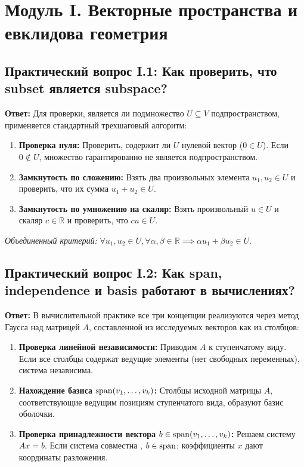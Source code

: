 \section{Модуль I. Векторные пространства и евклидова геометрия}

\subsection{Практический вопрос I.1: Как проверить, что subset является subspace?}
\textbf{Ответ:} Для проверки, является ли подмножество $U \subseteq V$ подпространством, применяется стандартный
трехшаговый алгоритм:
\begin{enumerate}
    \item \textbf{Проверка нуля:} Проверить, содержит ли $U$ нулевой вектор ($0 \in U$).
    Если $0 \notin U$, множество гарантированно не является подпространством.
    \item \textbf{Замкнутость по сложению:} Взять два произвольных элемента $u_1, u_2 \in U$ и проверить, что их
    сумма $u_1 + u_2 \in U$.
    \item \textbf{Замкнутость по умножению на скаляр:} Взять произвольный $u \in U$ и скаляр $c \in \mathbb{R}$
    и проверить, что $c u \in U$.
\end{enumerate}
\emph{Объединенный критерий:} $\forall u_1, u_2 \in U, \forall \alpha, \beta \in \mathbb{R} \implies \alpha u_1 + \beta
u_2 \in U$.

\subsection{Практический вопрос I.2: Как span, independence и basis работают в вычислениях?}
\textbf{Ответ:} В вычислительной практике все три концепции реализуются через метод Гаусса над матрицей $A$,
составленной из исследуемых векторов как из столбцов:
\begin{enumerate}
    \item \textbf{Проверка линейной независимости:} Приводим $A$ к ступенчатому виду.
    Если все столбцы содержат ведущие элементы (нет свободных переменных), система независима.
    \item \textbf{Нахождение базиса $\operatorname{span}(v_1, \dots, v_k)$:} Столбцы исходной матрицы $A$, соответствующие
    ведущим позициям ступенчатого вида, образуют базис оболочки.
    \item \textbf{Проверка принадлежности вектора $b \in \operatorname{span}(v_1, \dots, v_k)$:} Решаем систему $Ax = b$.
    Если система совместна , $b \in \operatorname{span}$; коэффициенты $x$ дают координаты разложения.
\end{enumerate}

